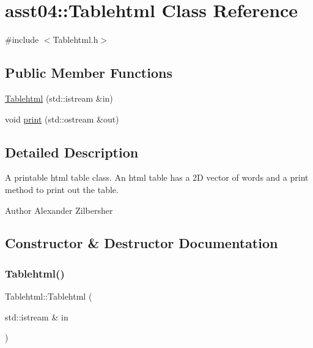 \hypertarget{classasst04_1_1_tablehtml}{}\section{asst04\+:\+:Tablehtml Class Reference}
\label{classasst04_1_1_tablehtml}


{\ttfamily \#include $<$Tablehtml.\+h$>$}

\subsection*{Public Member Functions}
\begin{DoxyCompactItemize}
\item 
\hyperlink{classasst04_1_1_tablehtml_a2ed5557a792802586aab2bc0598e22a5}{Tablehtml} (std\+::istream \&in)
\item 
void \hyperlink{classasst04_1_1_tablehtml_a8cec3bade82ab4eaccbf74faf207bb2e}{print} (std\+::ostream \&out)
\end{DoxyCompactItemize}


\subsection{Detailed Description}
A printable html table class. An html table has a 2D vector of words and a print method to print out the table.

\begin{DoxyAuthor}{Author}
Alexander Zilbersher 
\end{DoxyAuthor}


\subsection{Constructor \& Destructor Documentation}
\hypertarget{classasst04_1_1_tablehtml_a2ed5557a792802586aab2bc0598e22a5}{}\label{classasst04_1_1_tablehtml_a2ed5557a792802586aab2bc0598e22a5} 
\subsubsection{\texorpdfstring{Tablehtml()}{Tablehtml()}}
{\footnotesize\ttfamily Tablehtml\+::\+Tablehtml (\begin{DoxyParamCaption}\item[{std\+::istream \&}]{in }\end{DoxyParamCaption})}

